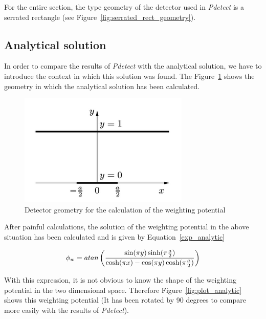 \documentclass[11pt]{article}
\begin{document}
	For the entire section, the type geometry of the detector used in \textit{Pdetect} is a
	serrated rectangle (see Figure~\ref{fig:serrated_rect_geometry}).

	\subsection{Analytical solution}

		In order to compare the results of \textit{Pdetect} with the analytical solution,
		we have to introduce the context in which this solution was found. The Figure~\ref{fig:analytic}
		shows the geometry in which the analytical solution has been calculated.

		\begin{figure}[H]
			\center
			\includegraphics[scale=0.5]{images/boundary_conditions/detector/analytic.png}
			\caption{Detector geometry for the calculation of the weighting
				potential~\cite{pixeldetector}}
			\label{fig:analytic}
		\end{figure}

		After painful calculations, the solution of the weighting potential in the above situation
		has been calculated and is given by Equation~\ref{exp_analytic}

		\begin{equation}
			\phi_w = atan\left({\sin(\pi y)\sinh(\pi {a\over{2}})\over
					{\cosh(\pi x)-\cos(\pi y)\cosh(\pi {a\over{2}})}}\right)
			\label{exp_analytic}
		\end{equation}

		With this expression, it is not obvious to know the shape of the weighting potential in the
		two dimensional space. Therefore Figure~\ref{fig:plot_analytic} shows this weighting potential
		(It has been rotated by 90 degrees to compare more easily with the results of \textit{Pdetect}).
\end{document}
